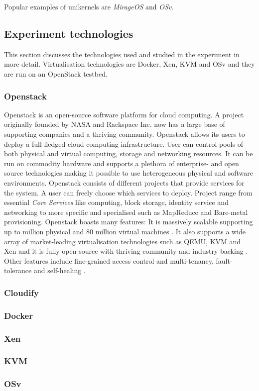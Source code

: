 Popular examples of unikernels are \textit{MirageOS}\cite{mirage} and \textit{OSv}\cite{osv}.

\subsection{Experiment technologies}

This section discusses the technologies used and studied in the experiment in more detail. Virtualisation technologies are Docker, Xen, KVM and OSv and they are run on an OpenStack testbed.

\subsubsection{Openstack}

Openstack \cite{openstackproject} is an open-source software platform for cloud computing. A project originally founded by NASA and Rackspace Inc. now has a large base of supporting companies  \cite{openstackpartners} and a thriving community.
	Openstack allows its users to deploy a full-fledged cloud computing infrastructure. User can control pools of both physical and virtual computing, storage and networking resources. It can be run on commodity hardware and supports a plethora of enterprise- and open source technologies making it possible to use heterogeneous physical and software environments.
	Openstack consists of different projects that provide services for the system. A user can freely choose which services to deploy. Project range from essential \textit{Core Services} like computing, block storage, identity service and networking to more specific and specialised such as MapReduce and Bare-metal provisioning\cite{openstackproject}. Openstack boasts many features: It is massively scalable supporting up to million physical and 80 million virtual machines \cite{openstack}. It also supports a wide array of market-leading virtualisation technologies such as QEMU, KVM and Xen and it is fully open-source with thriving community and industry backing \cite{openstackpartners}. Other features include fine-grained access control and multi-tenancy, fault-tolerance and self-healing \cite{openstackfeatures}.


\subsubsection{Cloudify}



\subsubsection{Docker}
\subsubsection{Xen}
\subsubsection{KVM}
\subsubsection{OSv}

